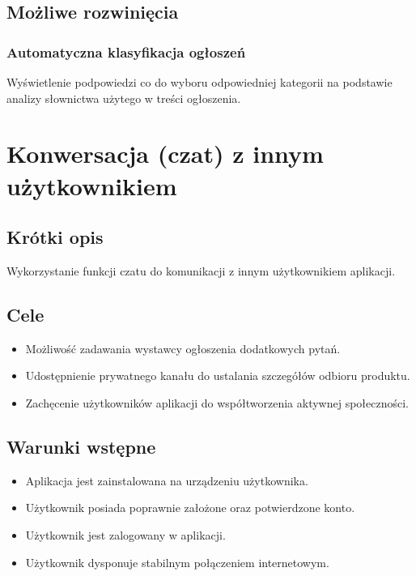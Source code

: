 \documentclass[12pt,a4paper,twoside]{article}
\begin{document}
    
    \subsection{Możliwe rozwinięcia}
    \subsubsection{Automatyczna klasyfikacja ogłoszeń}
    Wyświetlenie podpowiedzi co do wyboru odpowiedniej kategorii na podstawie analizy słownictwa użytego w treści ogłoszenia.
    
    
    \section{Konwersacja (czat) z innym użytkownikiem}
    
    
    \subsection{Krótki opis}
    Wykorzystanie funkcji czatu do komunikacji z innym użytkownikiem aplikacji.
    
    
    \subsection{Cele}
    \begin{itemize}
        \item Możliwość zadawania wystawcy ogłoszenia dodatkowych pytań.
        \item Udostępnienie prywatnego kanału do ustalania szczegółów odbioru produktu.
        \item Zachęcenie użytkowników aplikacji do współtworzenia aktywnej społeczności.
    \end{itemize}
    
    
    \subsection{Warunki wstępne}
    \begin{itemize}
        \item Aplikacja jest zainstalowana na urządzeniu użytkownika.
        \item Użytkownik posiada poprawnie założone oraz potwierdzone konto.
        \item Użytkownik jest zalogowany w aplikacji.
        \item Użytkownik dysponuje stabilnym połączeniem internetowym.
    \end{itemize}
    
\end{document}
